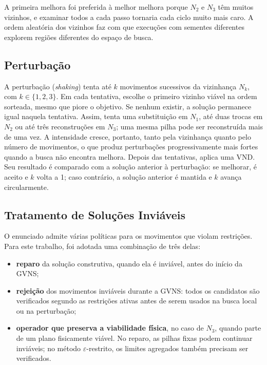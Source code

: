 \documentclass[conference]{IEEEtran}
\begin{document}
A primeira melhora foi preferida à melhor melhora porque $N_2$ e $N_3$ têm muitos vizinhos, e examinar todos a cada passo tornaria cada ciclo muito mais caro. A ordem aleatória dos vizinhos faz com que execuções com sementes diferentes explorem regiões diferentes do espaço de busca.

\subsection{Perturbação}

A perturbação (\textit{shaking}) tenta até $k$ movimentos sucessivos da vizinhança $N_k$, com $k \in \{1,2,3\}$. Em cada tentativa, escolhe o primeiro vizinho viável na ordem sorteada, mesmo que piore o objetivo. Se nenhum existir, a solução permanece igual naquela tentativa. Assim, tenta uma substituição em $N_1$, até duas trocas em $N_2$ ou até três reconstruções em $N_3$; uma mesma pilha pode ser reconstruída mais de uma vez. A intensidade cresce, portanto, tanto pela vizinhança quanto pelo número de movimentos, o que produz perturbações progressivamente mais fortes quando a busca não encontra melhora. Depois das tentativas, aplica uma VND. Seu resultado é comparado com a solução anterior à perturbação: se melhorar, é aceito e $k$ volta a 1; caso contrário, a solução anterior é mantida e $k$ avança circularmente.

\subsection{Tratamento de Soluções Inviáveis}

O enunciado admite várias políticas para os movimentos que violam restrições. Para este trabalho, foi adotada uma combinação de três delas:
\begin{itemize}
    \item \textbf{reparo} da solução construtiva, quando ela é inviável, antes do início da GVNS;
    \item \textbf{rejeição} dos movimentos inviáveis durante a GVNS: todos os candidatos são verificados segundo as restrições ativas antes de serem usados na busca local ou na perturbação;
    \item \textbf{operador que preserva a viabilidade física}, no caso de $N_3$, quando parte de um plano fisicamente viável. No reparo, as pilhas fixas podem continuar inviáveis; no método $\varepsilon$-restrito, os limites agregados também precisam ser verificados.
\end{itemize}
\end{document}
